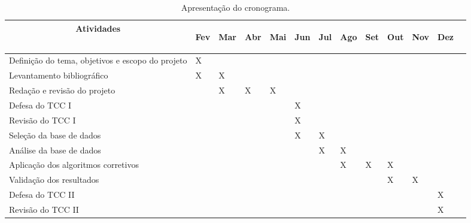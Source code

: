 \begin{table}[htbp]\fontsize{10pt}{7.2}\selectfont
  \centering
  \caption{Apresentação do cronograma.}
    \begin{tabular}{lllllllllllll}
    \toprule
    \multicolumn{1}{c}{\textbf{Atividades}} & \multicolumn{1}{c}{\begin{sideways}\textbf{Fev}\end{sideways}} & \multicolumn{1}{c}{\begin{sideways}\textbf{Mar}\end{sideways}} & \multicolumn{1}{c}{\begin{sideways}\textbf{Abr}\end{sideways}} & \multicolumn{1}{c}{\begin{sideways}\textbf{Mai}\end{sideways}} & \multicolumn{1}{c}{\begin{sideways}\textbf{Jun}\end{sideways}} & \multicolumn{1}{c}{\begin{sideways}\textbf{Jul}\end{sideways}} & \multicolumn{1}{c}{\begin{sideways}\textbf{Ago}\end{sideways}} & \multicolumn{1}{c}{\begin{sideways}\textbf{Set}\end{sideways}} & \multicolumn{1}{c}{\begin{sideways}\textbf{Out}\end{sideways}} & \multicolumn{1}{c}{\begin{sideways}\textbf{Nov}\end{sideways}} & \multicolumn{1}{c}{\begin{sideways}\textbf{Dez}\end{sideways}} \\
    \midrule
    Definição do tema, objetivos e escopo do projeto & X &  &  &  &  &  &  &  &  &  &  & \\
    Levantamento bibliográfico & X & X &  &  &  &  &  &  &  &  &  & \\
    Redação e revisão do projeto &  & X & X & X &  &  &  &  &  &  & \\
    Defesa do TCC I &  &  &  &  & X &  &  &  &  &  &  & \\
    Revisão do TCC I &  &  &  &  & X &  &  &  &  &  &  & \\
    Seleção da base de dados &  &  &  &  & X & X &  &  &  &  &  & \\
    Análise da base de dados &  &  &  &  &  & X & X &  &  &  &  & \\
    Aplicação dos algoritmos corretivos &  &  &  &  &  &  & X & X & X &  &  & \\
    Validação dos resultados &  &  &  &  &  &  &  &  & X & X &  & \\
    Defesa do TCC II &  &  &  &  &  &  &  &  &  &  & X & \\
    Revisão do TCC II &  &  &  &  &  &  &  &  &  &  & X & \\
    \bottomrule
    \end{tabular}
    \\
  \label{tab:cronograma}
\end{table}